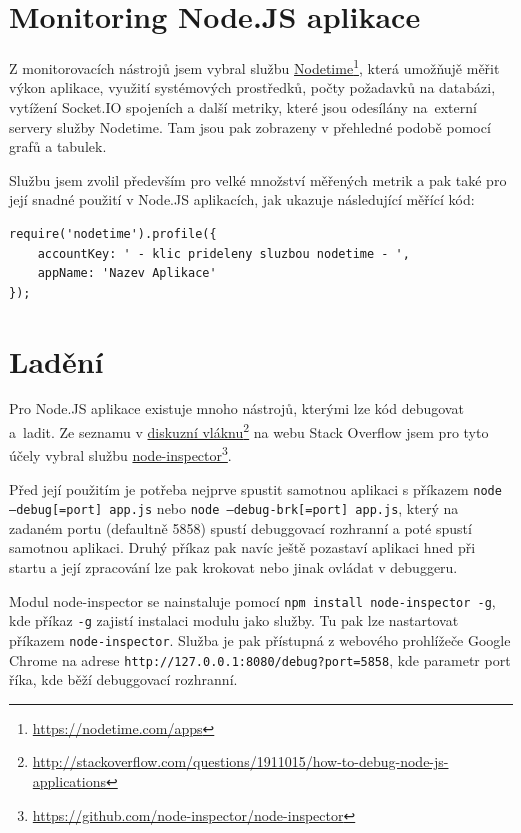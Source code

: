 \documentclass[thesis=M,czech]{FITthesis}[2012/06/26]
\newcommand\fnurl[2]{\href{#2}{#1}\footnote{\url{#2}}}
\begin{document}
\section{Monitoring Node.JS aplikace}
	
	Z monitorovacích nástrojů jsem vybral službu \fnurl{Nodetime}{https://nodetime.com/apps}, která umožňujě měřit výkon aplikace, využití systémových prostředků, počty požadavků na databázi, vytížení Socket.IO spojeních a další metriky, které jsou odesílány na~externí servery služby Nodetime. Tam jsou pak zobrazeny v přehledné podobě pomocí grafů a tabulek.
	
	Službu jsem zvolil především pro velké množství měřených metrik a pak také pro její snadné použití v Node.JS aplikacích, jak ukazuje následující měřící kód:

\begin{lstlisting}[basicstyle={\tiny\ttfamily}, frame=single]
require('nodetime').profile({
    accountKey: ' - klic prideleny sluzbou nodetime - ', 
    appName: 'Nazev Aplikace'
});
\end{lstlisting}
  
\section{Ladění}
	
	Pro Node.JS aplikace existuje mnoho nástrojů, kterými lze kód debugovat a~ladit. Ze seznamu v \fnurl{diskuzní vláknu}{http://stackoverflow.com/questions/1911015/how-to-debug-node-js-applications} na webu Stack Overflow jsem pro tyto účely vybral službu \fnurl{node-inspector}{https://github.com/node-inspector/node-inspector}.
	
	Před její použitím je potřeba nejprve spustit samotnou aplikaci s příkazem \texttt{node --debug[=port] app.js} nebo \texttt{node --debug-brk[=port] app.js}, který na zadaném portu (defaultně 5858) spustí debuggovací rozhranní a poté spustí samotnou aplikaci. Druhý příkaz pak navíc ještě pozastaví aplikaci hned při startu a její zpracování lze pak krokovat nebo jinak ovládat v debuggeru.
	
	Modul node-inspector se nainstaluje pomocí \texttt{npm install node-inspector -g}, kde příkaz \texttt{-g} zajistí instalaci modulu jako služby. Tu pak lze nastartovat příkazem \texttt{node-inspector}. Služba je pak přístupná z webového prohlížeče Google Chrome na adrese \texttt{http://127.0.0.1:8080/debug?port=5858}, kde parametr port říka, kde běží debuggovací rozhranní.
	
\end{document}
